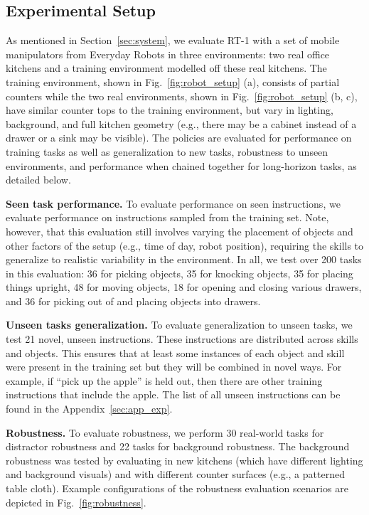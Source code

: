 \documentclass{article} %
\newcommand{\algname}{RT-1\xspace}
\begin{document}
\subsection{Experimental Setup}
\label{sec:exp_setup}
As mentioned in Section~\ref{sec:system}, we evaluate \algname with a set of mobile manipulators from Everyday Robots in three environments: two real office kitchens and a training environment modelled off these real kitchens. 
The training environment, shown in Fig.~\ref{fig:robot_setup} (a), consists of partial counters while the two real environments, shown in Fig.~\ref{fig:robot_setup} (b, c), have similar counter tops to the training environment, but vary in lighting, background, and full kitchen geometry (e.g., there may be a cabinet instead of a drawer or a sink may be visible).
The policies are evaluated for performance on training tasks as well as generalization to new tasks, robustness to unseen environments, and performance when chained together for long-horizon tasks, as detailed below.

\textbf{Seen task performance.}
To evaluate performance on seen instructions, we evaluate performance on instructions sampled from the training set. Note, however, that this evaluation still involves varying the placement of objects and other factors of the setup (e.g., time of day, robot position), requiring the skills to generalize to realistic variability in the environment.
In all, we test over 200 tasks in this evaluation: 36 for picking objects, 35 for knocking objects, 35 for placing things upright, 48 for moving objects, 18 for opening and closing various drawers, and 36 for picking out of and placing objects into drawers.

\textbf{Unseen tasks generalization.}
To evaluate generalization to unseen tasks, we test 21 novel, unseen instructions.
These instructions are distributed across skills and objects.
This ensures that at least some instances of each object and skill were present in the training set but they will be combined in novel ways. For example, if ``pick up the apple'' is held out, then there are other training instructions that include the apple. The list of all unseen instructions can be found in the Appendix~\ref{sec:app_exp}.

\textbf{Robustness.}
To evaluate robustness, we perform 30 real-world tasks for distractor robustness and 22 tasks for background robustness. 
The background robustness was tested by evaluating in new kitchens (which have different lighting and background visuals) and with different counter surfaces (e.g., a patterned table cloth). Example configurations of the robustness evaluation scenarios are depicted in Fig.~\ref{fig:robustness}.
\end{document}
